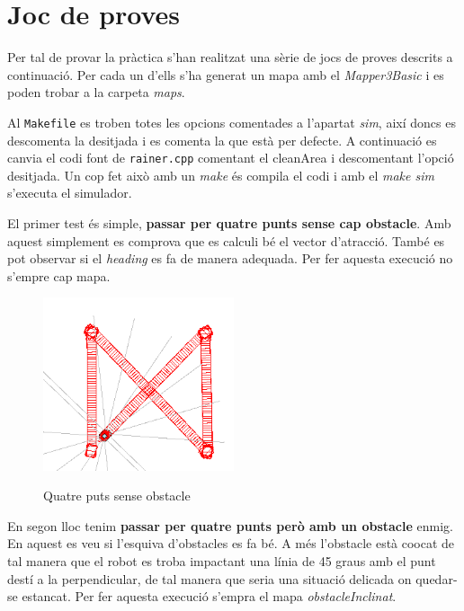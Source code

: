 \section{Joc de proves}

Per tal de provar la pràctica s'han realitzat una sèrie de jocs de proves
descrits a continuació. Per cada un d'ells s'ha generat un mapa amb el
\emph{Mapper3Basic} i es poden trobar a la carpeta \emph{maps}.

Al \texttt{Makefile} es troben totes les opcions comentades a l'apartat \emph{sim}, així doncs
es descomenta la desitjada i es comenta la que està per defecte. A continuació
es canvia el codi font
de \texttt{rainer.cpp} comentant el cleanArea i descomentant l'opció desitjada.
Un cop fet això amb un \emph{make} és compila el codi i amb el \emph{make sim}
s'executa el simulador.

El primer test és simple, \textbf{passar per quatre punts sense cap obstacle}. Amb aquest simplement es comprova que es calculi
bé el vector d'atracció. També es pot observar si el \emph{heading} es fa de
manera adequada. Per fer aquesta execució no s'empre cap mapa.

\begin{figure}[H]
\begin{center}\label{4punts}
 \includegraphics[width=0.5\textwidth]{diagrames/figures/4punts.png}
\end{center}
  \caption{Quatre puts sense obstacle}
\end{figure}

En segon lloc tenim \textbf{passar per quatre punts però amb un obstacle}
enmig. En aquest es veu si l'esquiva d'obstacles es fa bé. A més l'obstacle està
co\lgem ocat de tal manera que el robot es troba impactant una línia de 45 graus
amb el punt destí a la perpendicular, de tal manera que seria una situació
delicada on quedar-se estancat. Per fer aquesta execució s'empra el mapa
\emph{obstacleInclinat}.

